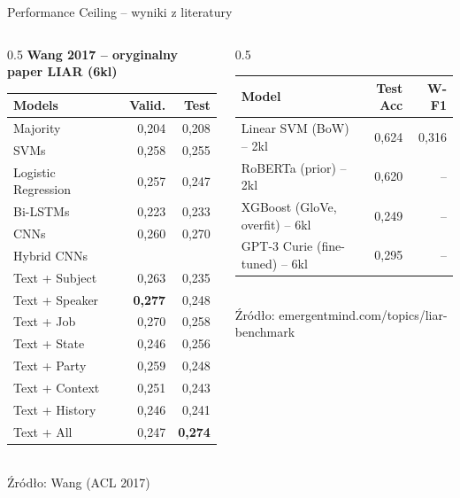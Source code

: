 \documentclass[10pt]{beamer}
\begin{document}
\begin{frame}{Performance Ceiling -- wyniki z literatury}
  \scriptsize
  \begin{columns}[T]
    \begin{column}{0.5\textwidth}
      \centering
      \textbf{Wang 2017 -- oryginalny paper LIAR (6kl)}\\[2pt]
      \begin{tabular}{lrr}
        \toprule
        Models               & Valid. & Test \\
        \midrule
        Majority             & 0{,}204 & 0{,}208 \\
        SVMs                 & 0{,}258 & 0{,}255 \\
        Logistic Regression  & 0{,}257 & 0{,}247 \\
        Bi-LSTMs             & 0{,}223 & 0{,}233 \\
        CNNs                 & 0{,}260 & 0{,}270 \\
        \midrule
        \multicolumn{3}{l}{Hybrid CNNs} \\
        Text + Subject       & 0{,}263 & 0{,}235 \\
        Text + Speaker       & \textbf{0{,}277} & 0{,}248 \\
        Text + Job           & 0{,}270 & 0{,}258 \\
        Text + State         & 0{,}246 & 0{,}256 \\
        Text + Party         & 0{,}259 & 0{,}248 \\
        Text + Context       & 0{,}251 & 0{,}243 \\
        Text + History       & 0{,}246 & 0{,}241 \\
        Text + All           & 0{,}247 & \textbf{0{,}274} \\
        \bottomrule
      \end{tabular}\\[2pt]
      {\tiny Źródło: Wang (ACL 2017)}
    \end{column}

    \begin{column}{0.5\textwidth}
      \centering
      \begin{tabular}{lrr}
        \toprule
        Model & Test Acc & W-F1 \\
        \midrule
        Linear SVM (BoW) -- 2kl                  & 0{,}624 & 0{,}316 \\
        RoBERTa (prior) -- 2kl                   & 0{,}620 & -- \\
        XGBoost (GloVe, overfit) -- 6kl          & 0{,}249 & -- \\
        GPT-3 Curie (fine-tuned) -- 6kl          & 0{,}295 & -- \\
        \bottomrule
      \end{tabular}\\[2pt]
      {\tiny Źródło: emergentmind.com/topics/liar-benchmark}

    \end{column}
  \end{columns}
\end{frame}
\end{document}
